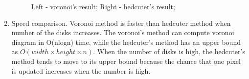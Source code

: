 \documentclass[11pt]{article}
\begin{document}
\begin{enumerate}
  \begin{figure}[h!]
      \centering
      \qquad
      \caption{Left - voronoi's result; Right - hedcuter's result;}
      \label{fig:distribution}
  \end{figure}
  \newpage
  \item Speed comparison. Voronoi method is faster than hedcuter method when number of the disks increases. The voronoi's method can compute voronoi diagram in O(nlogn) time, while the hedcuter's method has an upper bound as $O(width\times height \times n)$. When the number of disks is high, the hedcuter's method tends to move to its upper bound because the chance that one pixel is updated increases when the number is high.
  \begin{figure}[h!]
      \centering
      \label{fig:speed}
  \end{figure}


\end{enumerate}
\end{document}
